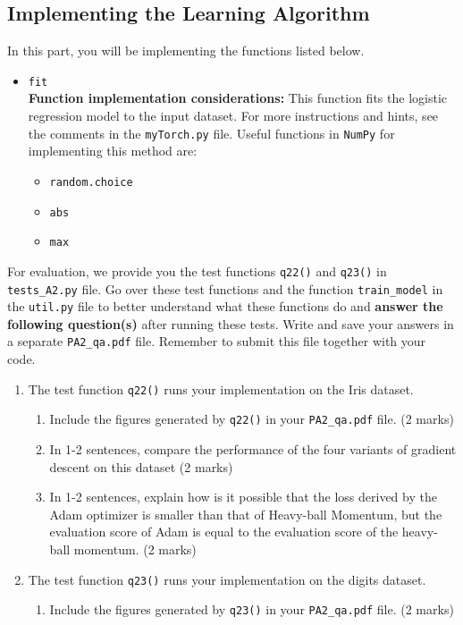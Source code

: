 \documentclass{article}
\theoremstyle{definition}
\begin{document}
\subsection{Implementing the Learning Algorithm}\label{fit}
In this part, you will be implementing the functions listed below. 
\begin{itemize}
	\item{\verb|fit|\\\textbf{Function implementation considerations:}
		This function fits the logistic regression model to the input dataset. For more instructions and hints, see the comments in the \verb|myTorch.py| file. 
		Useful functions in \verb|NumPy| for implementing this method are:
		\begin{itemize}
			\item \verb|random.choice|
			\item \verb|abs|
			\item \verb|max|
		\end{itemize}
		}
\end{itemize}
For evaluation, we provide you the test functions \verb|q22()| and \verb|q23()| in \verb|tests_A2.py| file. Go over these test functions and the function \verb|train_model| in the \verb|util.py| file to better understand what these functions do and \textbf{answer the following question(s)} after running these tests. Write and save your answers in a separate \verb|PA2_qa.pdf| file. Remember to submit this file together with your code.
\begin{enumerate}[label=\ref{fit}.\alph*]
	\item \label{ee}The test function \verb|q22()| runs your implementation on the Iris dataset.
	\begin{enumerate}[label=\ref{ee}.\roman*]
		\item Include the figures generated by \verb|q22()| in your \verb|PA2_qa.pdf| file. (2 marks)
		\item In 1-2 sentences, compare the performance of the four variants of gradient descent on this dataset (2 marks)
		\item In 1-2 sentences, explain how is it possible that the loss derived by the Adam optimizer is smaller than that of Heavy-ball Momentum, but the evaluation score of Adam is equal to the evaluation score of the heavy-ball momentum. (2 marks)
	\end{enumerate}
	\item \label{eee}The test function \verb|q23()| runs your implementation on the digits dataset.
	\begin{enumerate}[label=\ref{eee}.\roman*]
		\item Include the figures generated by \verb|q23()| in your \verb|PA2_qa.pdf| file. (2 marks)
	\end{enumerate}
\end{enumerate}
\end{document}
